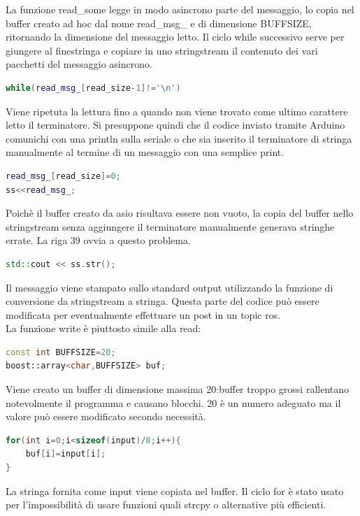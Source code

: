 \documentclass[a4paper]{article}
\begin{document}
La funzione read\_some legge in modo asincrono parte del messaggio, lo copia nel buffer creato ad hoc dal nome read\_msg\_ e di dimensione BUFFSIZE, ritornando la dimensione del messaggio letto.
Il ciclo while successivo serve per giungere al finestringa e copiare in uno stringstream il contenuto dei vari pacchetti del messaggio asincrono.

\begin{lstlisting}[language=C++,firstnumber=38]
while(read_msg_[read_size-1]!='\n')
\end{lstlisting}
Viene ripetuta la lettura fino a quando non viene trovato come ultimo carattere letto il terminatore. Si presuppone quindi che il codice inviato tramite Arduino comunichi con una println sulla seriale o che sia inserito il terminatore di stringa manualmente al termine di un messaggio con una semplice print.

\begin{lstlisting}[language=C++,firstnumber=39]
read_msg_[read_size]=0;
ss<<read_msg_;
\end{lstlisting}
Poichè il buffer creato da asio risultava essere non vuoto, la copia del buffer nello stringstream senza aggiungere il terminatore manualmente generava stringhe errate. La riga 39 ovvia a questo problema.

\begin{lstlisting}[language=C++,firstnumber=45]
std::cout << ss.str();
\end{lstlisting}

Il messaggio viene stampato sullo standard output utilizzando la funzione di conversione da stringstream a stringa. Questa parte del codice può essere modificata per eventualmente effettuare un post in un topic ros.
\\
La funzione write è piuttosto simile alla read:

\begin{lstlisting}[language=C++,firstnumber=21]
const int BUFFSIZE=20;	
boost::array<char,BUFFSIZE> buf;
\end{lstlisting}
Viene creato un buffer di dimensione massima 20:buffer troppo grossi rallentano notevolmente il programma e causano blocchi. 20 è un numero adeguato ma il valore può essere modificato secondo necessità.

\begin{lstlisting}[language=C++,firstnumber=24]
for(int i=0;i<sizeof(input)/8;i++){		
    buf[i]=input[i];
}
\end{lstlisting}
La stringa fornita come input viene copiata nel buffer. Il ciclo for è stato usato per l'impossibilità di usare funzioni quali strcpy o alternative più efficienti.
\end{document}
